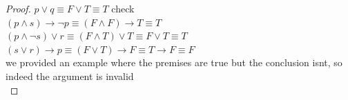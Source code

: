 \documentclass[a4paper,12pt]{article}
\begin{document}
\begin{question}
\begin{proof}
\(p \lor q \equiv F \lor T \equiv T\) check\\[0pt]
\((p \land s) \to \lnot p \equiv (F \land F) \to T \equiv T\) \\[0pt]
\((p \land \lnot s) \lor r \equiv (F \land T) \lor T \equiv F \lor T \equiv T\)\\[0pt]
\((s \lor r) \to p \equiv (F \lor T) \to F \equiv T \to F \equiv F\)\\[0pt]
we provided an example where the premises are true but the conclusion isnt, so indeed the argument is invalid\\[0pt]
\end{proof}
\end{question}
\end{document}
